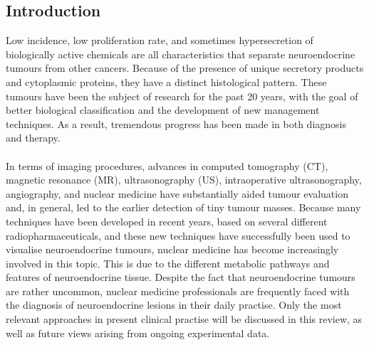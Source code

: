\documentclass{article}
\begin{document}
\begin{multicols}{2}

\section{Introduction}

Low incidence, low proliferation rate, and sometimes hypersecretion of biologically active chemicals are all characteristics that separate neuroendocrine tumours from other cancers. Because of the presence of unique secretory products and cytoplasmic proteins, they have a distinct histological pattern. These tumours have been the subject of research for the past 20 years, with the goal of better biological classification and the development of new management techniques. As a result, tremendous progress has been made in both diagnosis and therapy\cite{rindi2000introduction}.\\ \\
In terms of imaging procedures, advances in computed tomography (CT), magnetic resonance (MR), ultrasonography (US), intraoperative ultrasonography, angiography, and nuclear medicine have substantially aided tumour evaluation and, in general, led to the earlier detection of tiny tumour masses. Because many techniques have been developed in recent years, based on several different radiopharmaceuticals, and these new techniques have successfully been used to visualise neuroendocrine tumours, nuclear medicine has become increasingly involved in this topic. This is due to the different metabolic pathways and features of neuroendocrine tissue. Despite the fact that neuroendocrine tumours are rather uncommon, nuclear medicine professionals are frequently faced with the diagnosis of neuroendocrine lesions in their daily practise. Only the most relevant approaches in present clinical practise will be discussed in this review, as well as future views arising from ongoing experimental data\cite{capella1995revised}.


\end{multicols}
\end{document}
